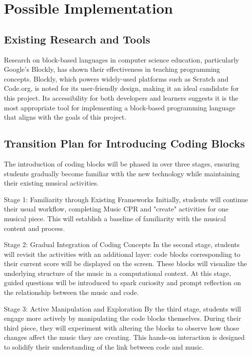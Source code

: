 \documentclass[manuscript,screen,review]{acmart}
\begin{document}
\section{Possible Implementation}
% 
\subsection{Existing Research and Tools}  
Research on block-based languages in computer science education, particularly Google’s Blockly, has shown their effectiveness in teaching programming concepts. Blockly, which powers widely-used platforms such as Scratch and Code.org, is noted for its user-friendly design, making it an ideal candidate for this project. Its accessibility for both developers and learners suggests it is the most appropriate tool for implementing a block-based programming language that aligns with the goals of this project.

\subsection{Transition Plan for Introducing Coding Blocks}
The introduction of coding blocks will be phased in over three stages, ensuring students gradually become familiar with the new technology while maintaining their existing musical activities. 

Stage 1: Familiarity through Existing Frameworks  
Initially, students will continue their usual workflow, completing Music CPR and "create" activities for one musical piece. This will establish a baseline of familiarity with the musical content and process.

Stage 2: Gradual Integration of Coding Concepts 
In the second stage, students will revisit the activities with an additional layer: code blocks corresponding to their current score will be displayed on the screen. These blocks will visualize the underlying structure of the music in a computational context. At this stage, guided questions will be introduced to spark curiosity and prompt reflection on the relationship between the music and code.

Stage 3: Active Manipulation and Exploration
By the third stage, students will engage more actively by manipulating the code blocks themselves. During their third piece, they will experiment with altering the blocks to observe how those changes affect the music they are creating. This hands-on interaction is designed to solidify their understanding of the link between code and music.
\end{document}
